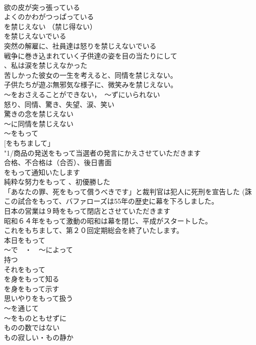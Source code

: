 \documentclass[8pt]{extreport}
\begin{document}
\begin{CJK}{UTF8}{min}
\\	欲の皮が突っ張っている　
\\	よくのかわがつっぱっている
\\	を禁じえない （禁じ得ない） 
\\	を禁じえないでいる 
\\	突然の解雇に、社員達は怒りを禁じえないでいる 
\\	戦争に巻き込まれていく子供達の姿を目の当たりにして
\\	、私は涙を禁じえなかった 
\\	苦しかった彼女の一生を考えると、同情を禁じえない。 
\\	子供たちが遊ぶ無邪気な様子に、微笑みを禁じえない。 
\\	～をおさえることができない，　～ずにいられない 
\\	怒り、同情、驚き、失望、涙、笑い	
\\	驚きの念を禁じえない 
\\	～に同情を禁じえない 
\\	～をもって 
\\	[をもちまして」	
\\	"1/商品の発送をもって当選者の発言にかえさせていただきます 
\\	合格、不合格は（合否）、後日書面
\\	をもって通知いたします 
\\	純粋な努力をもって 、初優勝した 
\\	「あなたの罪、死をもって償うべきです」と裁判官は犯人に死刑を宣告した (誅 
\\	この試合をもって、バファローズは55年の歴史に幕を下ろしました。 
\\	日本の営業は９時をもって閉店とさせていただきます 
\\	昭和６４年をもって激動の昭和は幕を閉じ、平成がスタートした。 
\\	これをもちまして、第２０回定期総会を終了いたします。 
\\	本日をもって 
\\	～で　・　～によって 
\\	持つ 
\\	それをもって 
\\	を身をもって知る 
\\	を身をもって示す 
\\	思いやりをもって扱う 
\\	～を通じて
\\	～をものともせずに 
\\	ものの数ではない 
\\	もの寂しい・もの静か	

\end{CJK}
\end{document}
